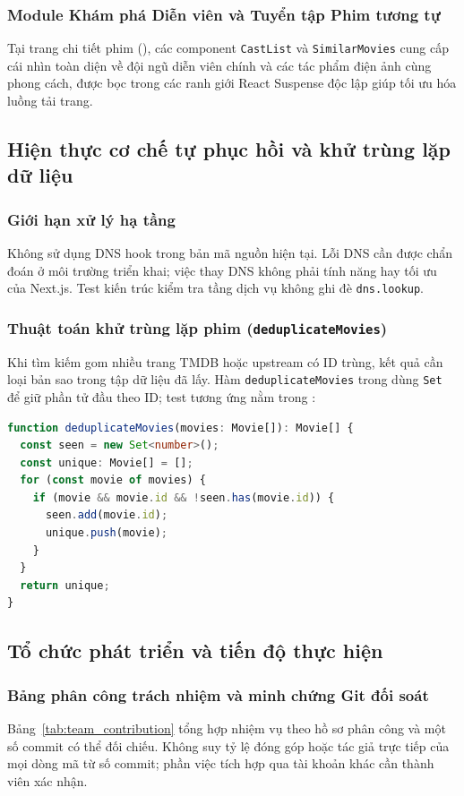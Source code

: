 \documentclass[12pt,a4paper]{extarticle}
\begin{document}
\subsubsection{Module Khám phá Diễn viên và Tuyển tập Phim tương tự}
Tại trang chi tiết phim (), các component \texttt{CastList} và \texttt{SimilarMovies} cung cấp cái nhìn toàn diện về đội ngũ diễn viên chính và các tác phẩm điện ảnh cùng phong cách, được bọc trong các ranh giới React Suspense độc lập giúp tối ưu hóa luồng tải trang.

\subsection{Hiện thực cơ chế tự phục hồi và khử trùng lặp dữ liệu}

\subsubsection{Giới hạn xử lý hạ tầng}
Không sử dụng DNS hook trong bản mã nguồn hiện tại. Lỗi DNS cần được chẩn đoán ở môi trường triển khai; việc thay DNS không phải tính năng hay tối ưu của Next.js. Test kiến trúc kiểm tra tầng dịch vụ không ghi đè \texttt{dns.lookup}.

\subsubsection{Thuật toán khử trùng lặp phim (\texttt{deduplicateMovies})}
Khi tìm kiếm gom nhiều trang TMDB hoặc upstream có ID trùng, kết quả cần loại bản sao trong tập dữ liệu đã lấy. Hàm \texttt{deduplicateMovies} trong  dùng \texttt{Set} để giữ phần tử đầu theo ID; test tương ứng nằm trong :
\begin{lstlisting}[language=TypeScript]
function deduplicateMovies(movies: Movie[]): Movie[] {
  const seen = new Set<number>();
  const unique: Movie[] = [];
  for (const movie of movies) {
    if (movie && movie.id && !seen.has(movie.id)) {
      seen.add(movie.id);
      unique.push(movie);
    }
  }
  return unique;
}
\end{lstlisting}

\clearpage
\subsection{Tổ chức phát triển và tiến độ thực hiện}

\subsubsection{Bảng phân công trách nhiệm và minh chứng Git đối soát}
Bảng~\ref{tab:team_contribution} tổng hợp nhiệm vụ theo hồ sơ phân công và một số commit có thể đối chiếu. Không suy tỷ lệ đóng góp hoặc tác giả trực tiếp của mọi dòng mã từ số commit; phần việc tích hợp qua tài khoản khác cần thành viên xác nhận.
\end{document}
